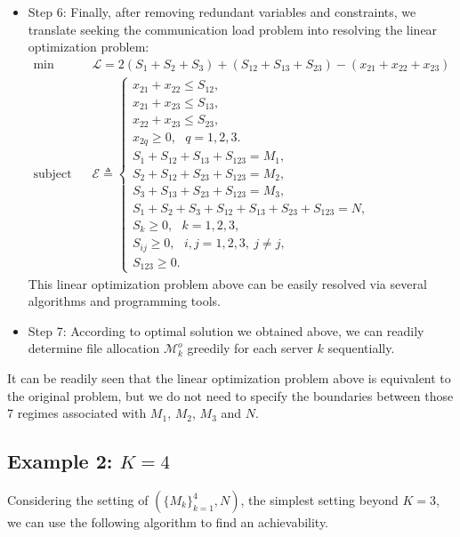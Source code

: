 \documentclass[conference]{IEEEtran}
\begin{document}
\begin{itemize}
\item{Step 6:} Finally, after removing redundant variables and constraints, we translate seeking the communication load problem into resolving the linear optimization problem:
\begin{eqnarray*}
\textrm{min} && \mathcal{L}=2(S_1+S_2+S_3)+(S_{12}+S_{13}+S_{23})-(x_{21}+x_{22}+x_{23}) \\
\textrm{subject to} && \mathcal{E}\triangleq \left\{\begin{array}{l}
x_{21}+x_{22}\leq S_{12},\\
x_{21}+x_{23}\leq S_{13},\\
x_{22}+x_{23}\leq S_{23},\\
x_{2q}\geq 0,~~~q=1,2,3.\\
S_1+S_{12}+S_{13}+S_{123}=M_1,\\
S_2+S_{12}+S_{23}+S_{123}=M_2,\\
S_3+S_{13}+S_{23}+S_{123}=M_3,\\
S_1+S_2+S_3+S_{12}+S_{13}+S_{23}+S_{123}=N,\\
S_k\geq 0,~~~k=1,2,3,\\
S_{ij}\geq 0,~~~i,j=1,2,3,~j\neq j,\\
S_{123}\geq 0.
\end{array}\right.
\end{eqnarray*}
This linear optimization problem above can be easily resolved via several algorithms and programming tools.

\item{Step 7:} According to optimal solution we obtained above, we can readily determine file allocation $\mathcal{M}_k^o$ greedily for each server $k$ sequentially.

\end{itemize}

\begin{remark}
It can be readily seen that the linear optimization problem above is equivalent to the original problem, but we do not need to specify the boundaries between those 7 regimes associated with $M_1$, $M_2$, $M_3$ and $N$.
\end{remark}



\subsection{Example 2: $K=4$}

Considering the setting of $(\{M_k\}_{k=1}^4,N)$, the simplest setting beyond $K=3$, we can use the following algorithm to find an achievability.
\end{document}
